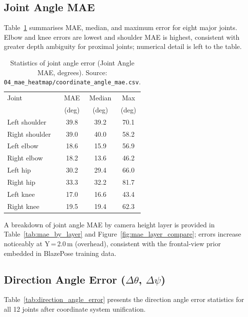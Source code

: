 \documentclass[twocolumn]{article}
\begin{document}
\subsection{Joint Angle MAE}

Table~\ref{tab:joint_angle_error} summarises MAE, median, and maximum
error for eight major joints. Elbow and knee errors are lowest and shoulder
MAE is highest, consistent with greater depth ambiguity for proximal joints;
numerical detail is left to the table.

\begin{table}[!t]
\centering
\caption{Statistics of joint angle error (Joint Angle MAE, degrees).
  Source: \texttt{04\_mae\_heatmap/coordinate\_angle\_mae.csv}.}
\label{tab:joint_angle_error}
\begin{tabular}{lccc}
\toprule
Joint          & MAE    & Median & Max    \\
               & (deg)  & (deg)  & (deg)  \\
\midrule
Left shoulder  & 39.8   & 39.2   & 70.1   \\
Right shoulder & 39.0   & 40.0   & 58.2   \\
Left elbow     & 18.6   & 15.9   & 56.9   \\
Right elbow    & 18.2   & 13.6   & 46.2   \\
Left hip       & 30.2   & 29.4   & 66.0   \\
Right hip      & 33.3   & 32.2   & 81.7   \\
Left knee      & 17.0   & 16.6   & 43.4   \\
Right knee     & 19.5   & 19.4   & 62.3   \\
\bottomrule
\end{tabular}
\end{table}

A breakdown of joint angle MAE by camera height layer is provided in
Table~\ref{tab:mae_by_layer} and Figure~\ref{fig:mae_layer_compare};
errors increase noticeably at Y\,=\,2.0\,m (overhead), consistent with
the frontal-view prior embedded in BlazePose training data.

\subsection{Direction Angle Error ($\Delta\theta$, $\Delta\psi$)}

Table~\ref{tab:direction_angle_error} presents the direction angle error
statistics for all 12 joints after coordinate system unification.
\end{document}
